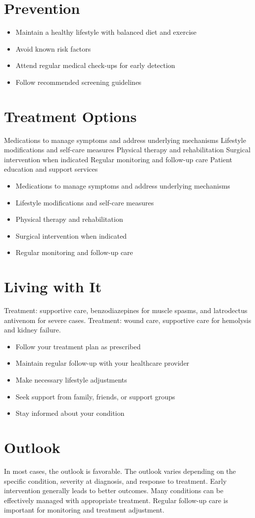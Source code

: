 \section{Prevention}
\begin{itemize}[noitemsep]
  \item Maintain a healthy lifestyle with balanced diet and exercise
  \item Avoid known risk factors
  \item Attend regular medical check-ups for early detection
  \item Follow recommended screening guidelines
\end{itemize}
\section{Treatment Options}
Medications to manage symptoms and address underlying mechanisms Lifestyle modifications and self-care measures Physical therapy and rehabilitation Surgical intervention when indicated Regular monitoring and follow-up care Patient education and support services

\begin{itemize}[noitemsep]
  \item Medications to manage symptoms and address underlying mechanisms
  \item Lifestyle modifications and self-care measures
  \item Physical therapy and rehabilitation
  \item Surgical intervention when indicated
  \item Regular monitoring and follow-up care
\end{itemize}
\section{Living with It}
Treatment: supportive care, benzodiazepines for muscle spasms, and latrodectus antivenom for severe cases. Treatment: wound care, supportive care for hemolysis and kidney failure.

\begin{itemize}[noitemsep]
  \item Follow your treatment plan as prescribed
  \item Maintain regular follow-up with your healthcare provider
  \item Make necessary lifestyle adjustments
  \item Seek support from family, friends, or support groups
  \item Stay informed about your condition
\end{itemize}
\section{Outlook}
In most cases, the outlook is favorable. The outlook varies depending on the specific condition, severity at diagnosis, and response to treatment. Early intervention generally leads to better outcomes. Many conditions can be effectively managed with appropriate treatment. Regular follow-up care is important for monitoring and treatment adjustment.

